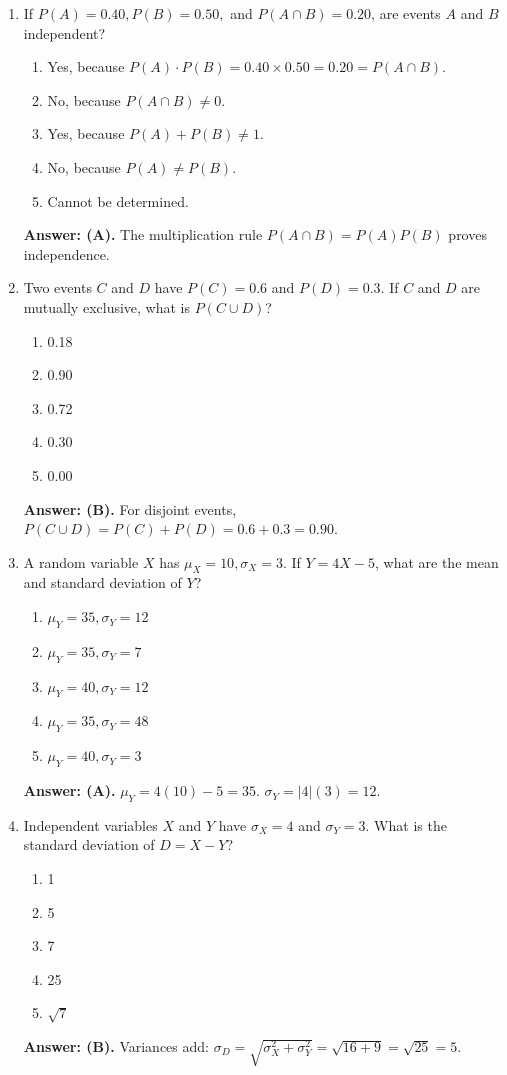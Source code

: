 \begin{enumerate}[leftmargin=1.5em]
  \item If $P(A) = 0.40, P(B) = 0.50,$ and $P(A \cap B) = 0.20$, are events $A$ and $B$ independent?
  \begin{enumerate}[label=(\Alph*)]
    \item Yes, because $P(A) \cdot P(B) = 0.40 \times 0.50 = 0.20 = P(A \cap B)$.
    \item No, because $P(A \cap B) \neq 0$.
    \item Yes, because $P(A) + P(B) \neq 1$.
    \item No, because $P(A) \neq P(B)$.
    \item Cannot be determined.
  \end{enumerate}
  \textbf{Answer: (A).} The multiplication rule $P(A \cap B) = P(A)P(B)$ proves independence.

  \item Two events $C$ and $D$ have $P(C) = 0.6$ and $P(D) = 0.3$. If $C$ and $D$ are mutually exclusive, what is $P(C \cup D)$?
  \begin{enumerate}[label=(\Alph*)]
    \item 0.18 \item 0.90 \item 0.72 \item 0.30 \item 0.00
  \end{enumerate}
  \textbf{Answer: (B).} For disjoint events, $P(C \cup D) = P(C) + P(D) = 0.6 + 0.3 = 0.90$.

  \item A random variable $X$ has $\mu_X = 10, \sigma_X = 3$. If $Y = 4X - 5$, what are the mean and standard deviation of $Y$?
  \begin{enumerate}[label=(\Alph*)]
    \item $\mu_Y = 35, \sigma_Y = 12$ \item $\mu_Y = 35, \sigma_Y = 7$ \item $\mu_Y = 40, \sigma_Y = 12$ \item $\mu_Y = 35, \sigma_Y = 48$ \item $\mu_Y = 40, \sigma_Y = 3$
  \end{enumerate}
  \textbf{Answer: (A).} $\mu_Y = 4(10) - 5 = 35$. $\sigma_Y = |4|(3) = 12$.

  \item Independent variables $X$ and $Y$ have $\sigma_X = 4$ and $\sigma_Y = 3$. What is the standard deviation of $D = X - Y$?
  \begin{enumerate}[label=(\Alph*)]
    \item 1 \item 5 \item 7 \item 25 \item $\sqrt{7}$
  \end{enumerate}
  \textbf{Answer: (B).} Variances add: $\sigma_D = \sqrt{\sigma_X^2 + \sigma_Y^2} = \sqrt{16 + 9} = \sqrt{25} = 5$.


\end{enumerate}
